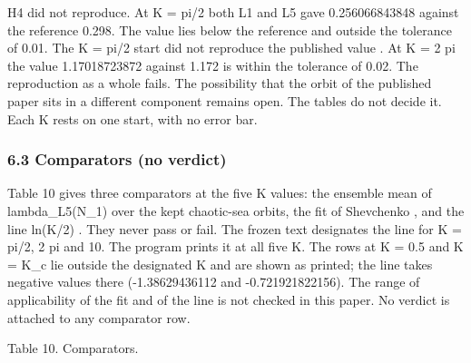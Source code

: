\documentclass[
  11pt,
]{article}
\begin{document}
H4 did not reproduce. At K = pi/2 both L1 and L5 gave 0.256066843848
against the reference 0.298. The value lies below the reference and
outside the tolerance of 0.01. The K = pi/2 start did not reproduce the
published value \citep{SalaArtuso2015}. At K = 2 pi the value
1.17018723872 against 1.172 is within the tolerance of 0.02. The
reproduction as a whole fails. The possibility that the orbit of the
published paper sits in a different component remains open. The tables
do not decide it. Each K rests on one start, with no error bar.

\subsubsection{6.3 Comparators (no
verdict)}\label{comparators-no-verdict}

Table 10 gives three comparators at the five K values: the ensemble mean
of lambda\_L5(N\_1) over the kept chaotic-sea orbits, the fit of
Shevchenko \citep{Shevchenko2014}, and the line ln(K/2)
\citep{Chirikov1979}. They never pass or fail. The frozen text
designates the line for K = pi/2, 2 pi and 10. The program prints it at
all five K. The rows at K = 0.5 and K = K\_c lie outside the designated
K and are shown as printed; the line takes negative values there
(-1.38629436112 and -0.721921822156). The range of applicability of the
fit and of the line is not checked in this paper. No verdict is attached
to any comparator row.

Table 10. Comparators.
\end{document}
